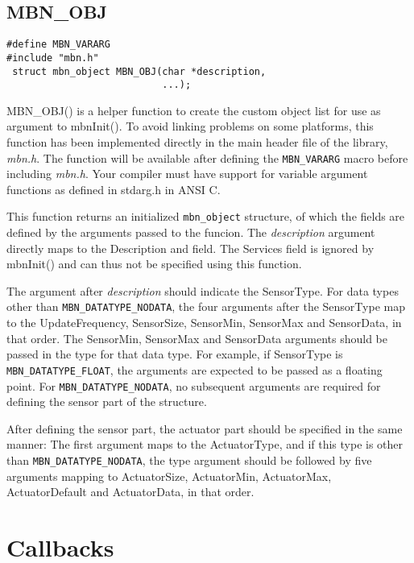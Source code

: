 \subsection{MBN\_OBJ}
\begin{verbatim}
#define MBN_VARARG
#include "mbn.h"
 struct mbn_object MBN_OBJ(char *description,
                           ...);
\end{verbatim}
MBN\_OBJ() is a helper function to create the custom object list for use as argument to mbnInit(). To avoid linking problems on some platforms, this function has been implemented directly in the main header file of the library, \textit{mbn.h}. The function will be available after defining the \verb|MBN_VARARG| macro before including \textit{mbn.h}. Your compiler must have support for variable argument functions as defined in stdarg.h in ANSI C.

This function returns an initialized \verb|mbn_object| structure, of which the fields are defined by the arguments passed to the funcion. The \textit{description} argument directly maps to the Description and field. The Services field is ignored by mbnInit() and can thus not be specified using this function.

The argument after \textit{description} should indicate the SensorType. For data types other than \verb|MBN_DATATYPE_NODATA|, the four arguments after the SensorType map to the UpdateFrequency, SensorSize, SensorMin, SensorMax and SensorData, in that order. The SensorMin, SensorMax and SensorData arguments should be passed in the type for that data type. For example, if SensorType is \verb|MBN_DATATYPE_FLOAT|, the arguments are expected to be passed as a floating point. For \verb|MBN_DATATYPE_NODATA|, no subsequent arguments are required for defining the sensor part of the structure.

After defining the sensor part, the actuator part should be specified in the same manner: The first argument maps to the ActuatorType, and if this type is other than \verb|MBN_DATATYPE_NODATA|, the type argument should be followed by five arguments mapping to ActuatorSize, ActuatorMin, ActuatorMax, ActuatorDefault and ActuatorData, in that order.




\cleardoublepage
\section{Callbacks}
\label{sec:cb}

